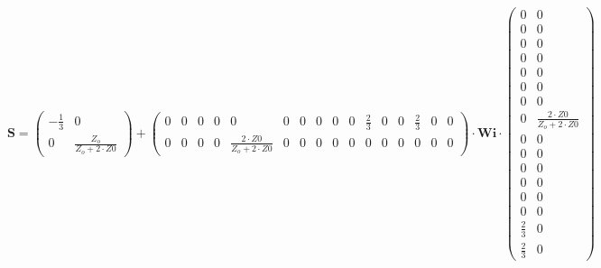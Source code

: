 \[ \mathbf{S} = \left(\begin{smallmatrix} -\frac{1}{3} & 0 \\ 0 & \frac{Z_o}{Z_o+2\cdot Z0} \end{smallmatrix}\right) + \left(\begin{smallmatrix} 0 & 0 & 0 & 0 & 0 & 0 & 0 & 0 & 0 & 0 & \frac{2}{3} & 0 & 0 & \frac{2}{3} & 0 & 0 \\ 0 & 0 & 0 & 0 & \frac{2\cdot Z0}{Z_o+2\cdot Z0} & 0 & 0 & 0 & 0 & 0 & 0 & 0 & 0 & 0 & 0 & 0 \end{smallmatrix}\right) \cdot \mathbf{Wi} \cdot\left(\begin{smallmatrix} 0 & 0 \\ 0 & 0 \\ 0 & 0 \\ 0 & 0 \\ 0 & 0 \\ 0 & 0 \\ 0 & 0 \\ 0 & \frac{2\cdot Z0}{Z_o+2\cdot Z0} \\ 0 & 0 \\ 0 & 0 \\ 0 & 0 \\ 0 & 0 \\ 0 & 0 \\ 0 & 0 \\ \frac{2}{3} & 0 \\ \frac{2}{3} & 0 \end{smallmatrix}\right) \]

